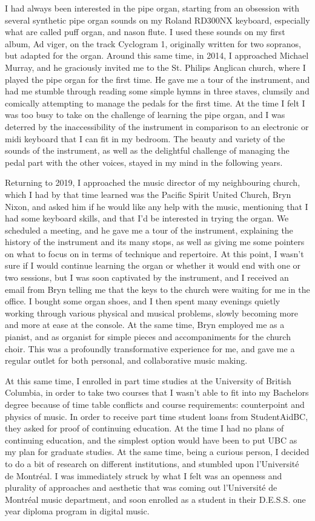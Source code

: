 \documentclass[12pt,twoside,maitrise]{dms_ks}
\theoremstyle{definition}
\begin{document}
I had always been interested in the pipe organ, starting from an obsession with several synthetic pipe organ sounds on my Roland RD300NX keyboard, especially what are called puff organ, and nason flute.
I used these sounds on my first album, Ad viger, on the track Cyclogram 1, originally written for two sopranos, but adapted for the organ.
Around this same time, in 2014, I approached Michael Murray, and he graciously invited me to the St.
Philips Anglican church, where I played the pipe organ for the first time.
He gave me a tour of the instrument, and had me stumble through reading some simple hymns in three staves, clumsily and comically attempting to manage the pedals for the first time.
At the time I felt I was too busy to take on the challenge of learning the pipe organ, and I was deterred by the inaccessibility of the instrument in comparison to an electronic or midi keyboard that I can fit in my bedroom.
The beauty and variety of the sounds of the instrument, as well as the delightful challenge of managing the pedal part with the other voices,  stayed in my mind in the following years.

Returning to 2019, I approached the music director of my neighbouring church, which I had by that time learned was the Pacific Spirit United Church, Bryn Nixon, and asked him if he would like any help with the music, mentioning that I had some keyboard skills, and that I’d be interested in trying the organ.
We scheduled a meeting, and he gave me a tour of the instrument, explaining the history of the instrument and its many stops, as well as giving me some pointers on what to focus on in terms of technique and repertoire.
At this point, I wasn’t sure if I would continue learning the organ or whether it would end with one or two sessions, but I was soon captivated by the instrument, and I received an email from Bryn telling me that the keys to the church were waiting for me in the office.
I bought some organ shoes, and I then spent many evenings quietly working through various physical and musical problems, slowly becoming more and more at ease at the console.
At the same time, Bryn employed me as a pianist, and as organist for simple pieces and accompaniments for the church choir.
This was a profoundly transformative experience for me, and gave me a regular outlet for both personal, and collaborative music making.

At this same time, I enrolled in part time studies at the University of British Columbia, in order to take two courses that I wasn’t able to fit into my Bachelors degree because of time table conflicts and course requirements: counterpoint and physics of music.
In order to receive part time student loans from StudentAidBC, they asked for proof of continuing education.
At the time I had no plans of continuing education, and the simplest option would have been to put UBC as my plan for graduate studies.
At the same time, being a curious person, I decided to do a bit of research on different institutions, and stumbled upon l'Université de Montréal.
I was immediately struck by what I felt was an openness and plurality of approaches and aesthetic that was coming out l'Université de Montréal music department, and soon enrolled as a student in their D.E.S.S.
one year diploma program in digital music.
\end{document}
